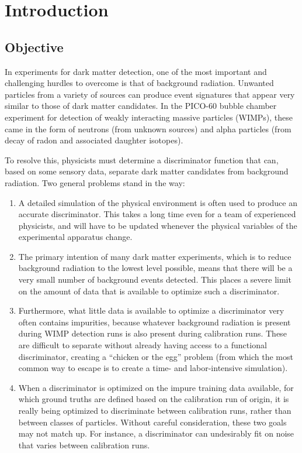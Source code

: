 \documentclass[10pt]{article}
\begin{document}
\section{Introduction}

\subsection{Objective}

In experiments for dark matter detection, one of the most important and challenging hurdles to overcome is that of background radiation. Unwanted particles from a variety of sources can produce event signatures that appear very similar to those of dark matter candidates. In the PICO-60 bubble chamber experiment for detection of weakly interacting massive particles (WIMPs), these came in the form of neutrons (from unknown sources) and alpha particles (from decay of radon and associated daughter isotopes).

To resolve this, physicists must determine a discriminator function that can, based on some sensory data, separate dark matter candidates from background radiation. Two general problems stand in the way:

\begin{enumerate}
    \item A detailed simulation of the physical environment is often used to produce an accurate discriminator. This takes a long time even for a team of experienced physicists, and will have to be updated whenever the physical variables of the experimental apparatus change.
    \item The primary intention of many dark matter experiments, which is to reduce background radiation to the lowest level possible, means that there will be a very small number of background events detected. This places a severe limit on the amount of data that is available to optimize such a discriminator.
    \item Furthermore, what little data is available to optimize a discriminator very often contains impurities, because whatever background radiation is present during WIMP detection runs is also present during calibration runs. These are difficult to separate without already having access to a functional discriminator, creating a ``chicken or the egg'' problem (from which the most common way to escape is to create a time- and labor-intensive simulation).
    \item When a discriminator is optimized on the impure training data available, for which ground truths are defined based on the calibration run of origin, it is really being optimized to discriminate between calibration runs, rather than between classes of particles. Without careful consideration, these two goals may not match up. For instance, a discriminator can undesirably fit on noise that varies between calibration runs.
\end{enumerate}
\end{document}
